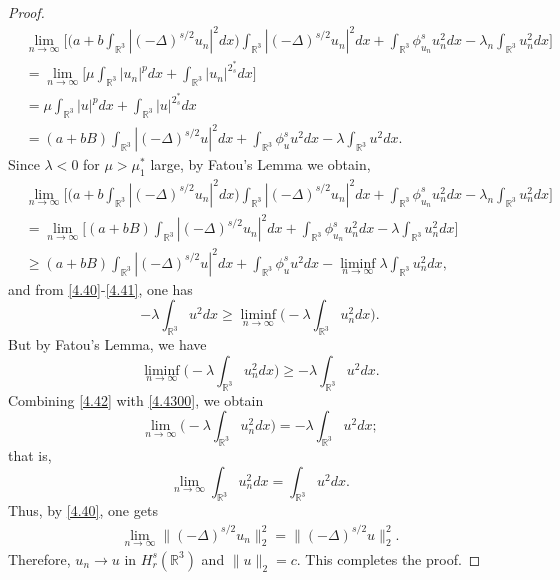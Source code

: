 \documentclass[reqno]{amsart}
\begin{document}
\begin{proof}
\begin{equation}\label{4.40}
\begin{split}
&\lim_{n\to\infty}\Big[\Big(a+b\int_{\mathbb{R}^3}|(-\Delta)^{s/2}u_n|^2dx\Big)
\int_{\mathbb{R}^3}|(-\Delta)^{s/2}u_n|^2 dx+\int_{\mathbb{R}^3}\phi^s_{u_n}{u^2_n}dx
-\lambda_n \int_{\mathbb{R}^3} {u^2_n} dx\Big]\\
&=\lim_{n\to\infty} \Big[\mu \int_{\mathbb{R}^3}|u_n|^{p}dx
 +\int_{\mathbb{R}^3}|u_n|^{2^*_s} dx\Big]\\
&=\mu \int_{\mathbb{R}^3}|u|^{p}dx+\int_{\mathbb{R}^3}|u|^{2^*_s} dx\\
&=(a+bB)\int_{\mathbb{R}^3}|(-\Delta)^{s/2}u|^2 dx+\int_{\mathbb{R}^3}\phi^s_{u}{u^2}dx
 -\lambda \int_{\mathbb{R}^3} {u^2} dx.
\end{split}
\end{equation}
Since $\lambda<0$ for $\mu>\mu^*_1$ large,  by Fatou's Lemma we obtain,
\begin{equation}\label{4.41}
\begin{split}
&\lim_{n\to\infty}\Big[\Big(a+b\int_{\mathbb{R}^3}|(-\Delta)^{s/2}u_n|^2dx\Big)
 \int_{\mathbb{R}^3}|(-\Delta)^{s/2}u_n|^2 dx
 +\int_{\mathbb{R}^3}\phi^s_{u_n}{u^2_n}dx-\lambda_n \int_{\mathbb{R}^3} {u^2_n} dx\Big]\\
&=\lim_{n\to\infty}\Big[(a+bB)\int_{\mathbb{R}^3}|(-\Delta)^{s/2}u_n|^2 dx
 +\int_{\mathbb{R}^3}\phi^s_{u_n}{u^2_n}dx-\lambda \int_{\mathbb{R}^3} {u^2_n} dx\Big]\\
&\geq (a+bB)\int_{\mathbb{R}^3}|(-\Delta)^{s/2}u|^2 dx
 +\int_{\mathbb{R}^3}\phi^s_{u}{u^2}dx-\liminf_{n\to\infty}\lambda 
 \int_{\mathbb{R}^3} {u^2_n} dx,
\end{split}
\end{equation}
and from \eqref{4.40}-\eqref{4.41}, one has
\begin{equation}\label{4.42}
-\lambda \int_{\mathbb{R}^3} {u^2} dx\geq\liminf_{n\to\infty}
 \Big(-\lambda \int_{\mathbb{R}^3} {u^2_n} dx\Big).
\end{equation}
But by Fatou's Lemma, we have
\begin{equation}\label{4.4300}
 \liminf_{n\to\infty}\Big(-\lambda\int_{\mathbb{R}^3} {u^2_n} dx\Big)
 \geq-\lambda \int_{\mathbb{R}^3} {u^2} dx.
\end{equation}
Combining \eqref{4.42} with \eqref{4.4300}, we obtain
\[ \label{4.43}
\lim_{n\to\infty}\Big(-\lambda \int_{\mathbb{R}^3} {u^2_n} dx\Big)
=-\lambda \int_{\mathbb{R}^3} {u^2} dx;
\]
that is,
\[ \label{4.43}
\lim_{n\to\infty} \int_{\mathbb{R}^3} {u^2_n} dx= \int_{\mathbb{R}^3} {u^2} dx.
\]
Thus, by \eqref{4.40}, one gets
\[ \label{4.43}
\begin{split}
\lim_{n\to\infty}  \|(-\Delta)^{s/2}u_n\|^2_2 = \|(-\Delta)^{s/2}u\|^2_2.
\end{split}
\]
Therefore, $u_n\to u$ in $H^s_{r}(\mathbb{R}^3)$ and $\|u\|_2=c$.
 This completes the proof.
\end{proof}
\end{document}
